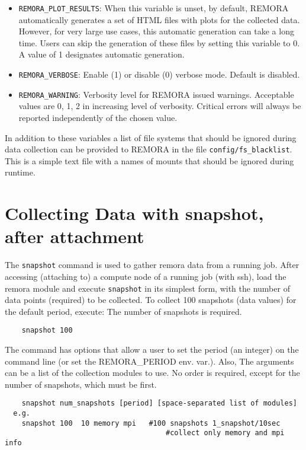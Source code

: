 \documentclass[10pt,a4paper]{report}
\begin{document}
{\begin{itemize}
    \item \texttt{REMORA\_PLOT\_RESULTS}: When this variable is unset, by default, REMORA automatically generates a set of HTML files with plots for the collected data. However, for very large use cases, this automatic generation can take a long time. Users can skip the generation of these files by setting this variable to 0. A value of 1 designates automatic generation.

	\item \texttt{REMORA\_VERBOSE}: Enable (1) or disable (0) verbose mode. Default is disabled.
	
	\item \texttt{REMORA\_WARNING}: Verbosity level for REMORA issued warnings. Acceptable values are 0, 1, 2 in increasing level of verbosity. Critical errors will always be reported independently of the chosen value.
\end{itemize}
}

In addition to these variables a list of file systems that should be ignored during data collection can be provided to REMORA in the file \verb+config/fs_blacklist+. This is a simple text file with a names of mounts that should be ignored during runtime.

\section{Collecting Data with snapshot, after attachment}

The \verb+snapshot+ command is used to gather remora data from a running job.
After accessing (attaching to) a compute node of a running job (with ssh), load the remora module
and execute \verb+snapshot+ in its simplest form, with the number of data points (required) 
to be collected. To collect 100 snapshots (data values) for the default period, execute:
The number of snapshots is required.

\begin{verbatim}
	snapshot 100
\end{verbatim}

The command has options that allow a user to set the period (an integer) on the
command line (or set the REMORA\_PERIOD env. var.).  Also, The arguments
can be a list of the collection modules to use. No order is required, except
for the number of snapshots, which must be first.

\begin{verbatim}
	snapshot num_snapshots [period] [space-separated list of modules]
  e.g.
	snapshot 100  10 memory mpi   #100 snapshots 1_snapshot/10sec 
                                      #collect only memory and mpi info
\end{verbatim}
\end{document}
